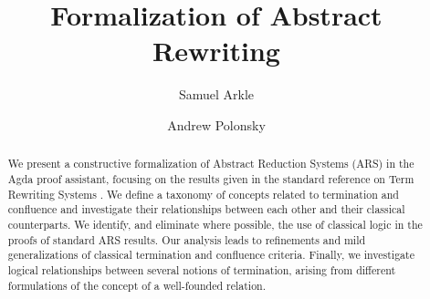 \documentclass[letterpaper,USenglish,cleveref, autoref, thm-restate]{lipics-v2021}
\title{Formalization of Abstract Rewriting}
\author{Samuel Arkle}{Appalachian State University, USA}
{arklesd@appstate.edu}{}{}
\author{Andrew Polonsky}{Appalachian State University, USA}
{polonskya@appstate.edu}
{}
{}%
\begin{document}
\maketitle

\begin{abstract}
    We present a constructive formalization of Abstract Reduction Systems (ARS)
     in the Agda proof assistant, focusing on the results given in
     the standard reference on Term Rewriting Systems \cite{Terese}. We define a taxonomy of concepts related to termination and
     confluence and investigate their relationships between each other and their
     classical counterparts. We identify, and eliminate where possible, the use of classical
     logic in the proofs of standard ARS results. Our analysis leads to refinements and mild
      generalizations of classical termination and confluence criteria.
      Finally, we investigate logical relationships between several notions of termination, 
      arising from different formulations of the concept of a well-founded relation.
    \end{abstract}







% 
   
\end{document}

